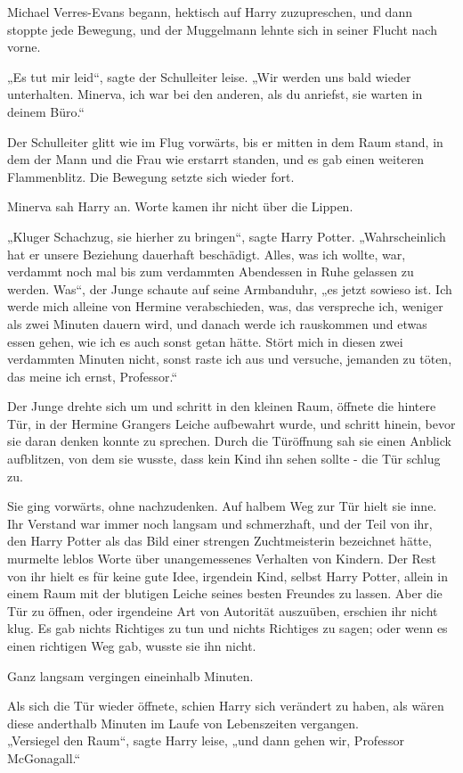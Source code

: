 {Michael Verres-Evans begann, hektisch auf Harry zuzupreschen, und dann stoppte jede Bewegung, und der Muggelmann lehnte sich in seiner Flucht nach vorne.

„Es tut mir leid“, sagte der Schulleiter leise. „Wir werden uns bald wieder unterhalten. Minerva, ich war bei den anderen, als du anriefst, sie warten in deinem Büro.“

Der Schulleiter glitt wie im Flug vorwärts, bis er mitten in dem Raum stand, in dem der Mann und die Frau wie erstarrt standen, und es gab einen weiteren Flammenblitz. Die Bewegung setzte sich wieder fort.

Minerva sah Harry an. Worte kamen ihr nicht über die Lippen.

„Kluger Schachzug, sie hierher zu bringen“, sagte Harry Potter. „Wahrscheinlich hat er unsere Beziehung dauerhaft beschädigt. Alles, was ich wollte, war, verdammt noch mal bis zum verdammten Abendessen in Ruhe gelassen zu werden. Was“, der Junge schaute auf seine Armbanduhr, „es jetzt sowieso ist. Ich werde mich alleine von Hermine verabschieden, was, das verspreche ich, weniger als zwei Minuten dauern wird, und danach werde ich rauskommen und etwas essen gehen, wie ich es auch sonst getan hätte. Stört mich in diesen zwei verdammten Minuten nicht, sonst raste ich aus und versuche, jemanden zu töten, das meine ich ernst, Professor.“

Der Junge drehte sich um und schritt in den kleinen Raum, öffnete die hintere Tür, in der Hermine Grangers Leiche aufbewahrt wurde, und schritt hinein, bevor sie daran denken konnte zu sprechen. Durch die Türöffnung sah sie einen Anblick aufblitzen, von dem sie wusste, dass kein Kind ihn sehen sollte - die Tür schlug zu.

Sie ging vorwärts, ohne nachzudenken. Auf halbem Weg zur Tür hielt sie inne. Ihr Verstand war immer noch langsam und schmerzhaft, und der Teil von ihr, den Harry Potter als das Bild einer strengen Zuchtmeisterin bezeichnet hätte, murmelte leblos Worte über unangemessenes Verhalten von Kindern. Der Rest von ihr hielt es für keine gute Idee, irgendein Kind, selbst Harry Potter, allein in einem Raum mit der blutigen Leiche seines besten Freundes zu lassen. Aber die Tür zu öffnen, oder irgendeine Art von Autorität auszuüben, erschien ihr nicht klug. Es gab nichts Richtiges zu tun und nichts Richtiges zu sagen; oder wenn es einen richtigen Weg gab, wusste sie ihn nicht.

Ganz langsam vergingen eineinhalb Minuten.

Als sich die Tür wieder öffnete, schien Harry sich verändert zu haben, als wären diese anderthalb Minuten im Laufe von Lebenszeiten vergangen.\\ „Versiegel den Raum“, sagte Harry leise, „und dann gehen wir, Professor McGonagall.“

}

